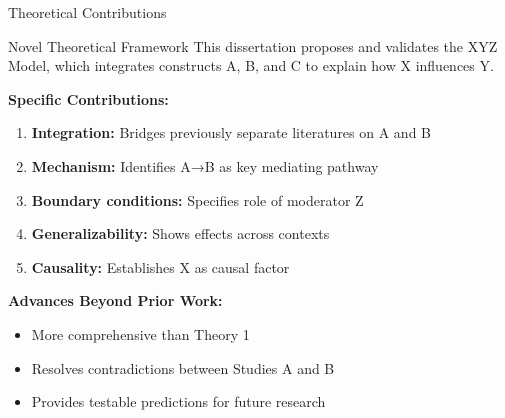 \documentclass[aspectratio=169,12pt]{beamer}
\begin{document}
\begin{frame}{Theoretical Contributions}
  \begin{exampleblock}{Novel Theoretical Framework}
    This dissertation proposes and validates the XYZ Model, which integrates constructs A, B, and C to explain how X influences Y.
  \end{exampleblock}
  
  \vspace{0.5cm}
  
  \textbf{Specific Contributions:}
  \begin{enumerate}
    \item \textbf{Integration:} Bridges previously separate literatures on A and B
    \item \textbf{Mechanism:} Identifies A→B as key mediating pathway
    \item \textbf{Boundary conditions:} Specifies role of moderator Z
    \item \textbf{Generalizability:} Shows effects across contexts
    \item \textbf{Causality:} Establishes X as causal factor
  \end{enumerate}
  
  \vspace{0.5cm}
  
  \textbf{Advances Beyond Prior Work:}
  \begin{itemize}
    \item More comprehensive than Theory 1 \cite{theory1}
    \item Resolves contradictions between Studies A and B
    \item Provides testable predictions for future research
  \end{itemize}
\end{frame}
\end{document}
